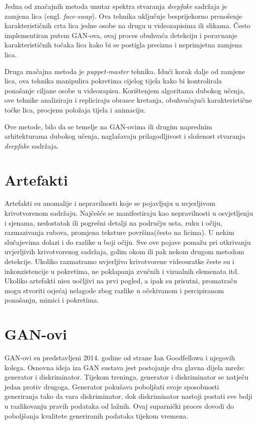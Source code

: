 \documentclass[seminarski, times, utf8]{fer}
\begin{document}
Jedna od značajnih metoda unutar spektra stvaranja \textit{deepfake} sadržaja je zamjena lica (engl. \textit{face-swap}). Ova tehnika uključuje besprijekorno prenošenje karakterističnih crta lica jedne osobe na drugu u videozapisima ili slikama. Često implementiran putem GAN-ova, ovaj proces obuhvaća detekciju i poravnanje karakterističnih točaka lica kako bi se postigla precizna i neprimjetna zamjena lica.

Druga značajna metoda je \textit{puppet-master} tehnika. Idući korak dalje od zamjene lica, ova tehnika manipulira pokretima cijelog tijela kako bi kontrolirala ponašanje ciljane osobe u videozapisu. Korištenjem algoritama dubokog učenja, ove tehnike analiziraju i repliciraju obrasce kretanja, obuhvaćajući karakteristične točke lica, procjenu položaja tijela i animaciju.

Ove metode, bilo da se temelje na GAN-ovima ili drugim naprednim arhitekturama dubokog učenja, naglašavaju prilagodljivost i složenost stvaranja \textit{deepfake} sadržaja. 

\section{Artefakti}
Artefakti su anomalije i nepravilnosti koje se pojavljuju u uvjerljivom krivotvorenom sadržaju. Najčešće se manifestiraju kao nepravilnosti u osvjetljenju i sjenama, nedostatak ili pogrešni detalji na području usta, ruku i očiju, razmazivanja rubova, promjena teksture površina(često na licima).
U nekim slučajevima dolazi i do razlike u boji očiju. Sve ove pojave pomažu pri otkrivanju uvjerljivih krivotvorenog sadržaja, golim okom ili pak nekom drugom metodom detekcije. Ukoliko razmatramo uvjerljivo krivotvorene videouratke česte su i inkonzistencije u pokretima, ne poklapanja zvučnih i vizualnih elemenata itd.
Ukoliko artefakti nisu uočljivi na prvi pogled, a ipak su prisutni, promatraču mogu stvoriti osjećaj nelagode zbog razlike u očekivanom i percipiranom ponašanju, mimici i pokretima.
\section{GAN-ovi}
GAN-ovi su predstavljeni 2014. godine od strane Ian Goodfellowa i njegovih kolega.
Osnovna ideja iza GAN sustava jest postojanje dva glavna dijela mreže: generator i diskriminator.
Tijekom treninga, generator i diskriminator se natječu jedan protiv drugoga. Generator pokušava poboljšati svoje sposobnosti generiranja tako da vara diskriminator, dok diskriminator nastoji postati sve bolji u razlikovanju pravih podataka od lažnih. Ovaj suparnički proces dovodi do poboljšanja kvalitete generiranih podataka tijekom vremena.
\end{document}
